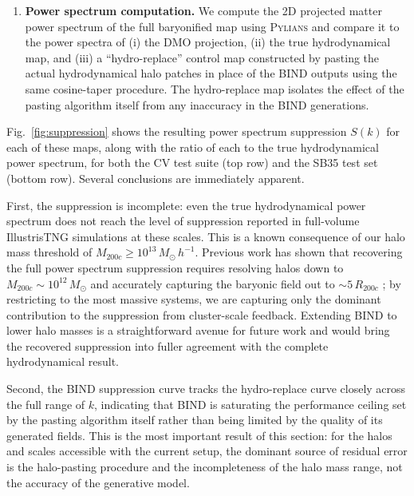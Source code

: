 \documentclass[linenumbers,trackchanges, twocolumn]{aastex701}
\begin{document}
\begin{enumerate}
    \item \textbf{Power spectrum computation.} We compute the 2D projected matter power spectrum of the full baryonified map using \textsc{Pylians} \citep{Pylians} and compare it to the power spectra of (i) the DMO projection, (ii) the true hydrodynamical map, and (iii) a ``hydro-replace'' control map constructed by pasting the actual hydrodynamical halo patches in place of the \textsc{BIND} outputs using the same cosine-taper procedure. The hydro-replace map isolates the effect of the pasting algorithm itself from any inaccuracy in the \textsc{BIND} generations.
\end{enumerate}

Fig.~\ref{fig:suppression} shows the resulting power spectrum suppression $S(k)$ for each of these maps, along with the ratio of each to the true hydrodynamical power spectrum, for both the CV test suite (top row) and the SB35 test set (bottom row). Several conclusions are immediately apparent.

First, the suppression is incomplete: even the true hydrodynamical power spectrum does not reach the level of suppression reported in full-volume IllustrisTNG simulations at these scales. This is a known consequence of our halo mass threshold of $M_{200c} \geq 10^{13}\,M_\odot\,h^{-1}$. Previous work has shown that recovering the full power spectrum suppression requires resolving halos down to $M_{200c} \sim 10^{12}\,M_\odot$ and accurately capturing the baryonic field out to $\sim 5\,R_{200c}$ \citep{vanDaalen-2020, Lee-2026a}; by restricting to the most massive systems, we are capturing only the dominant contribution to the suppression from cluster-scale feedback. Extending \textsc{BIND} to lower halo masses is a straightforward avenue for future work and would bring the recovered suppression into fuller agreement with the complete hydrodynamical result.

Second, the \textsc{BIND} suppression curve tracks the hydro-replace curve closely across the full range of $k$, indicating that \textsc{BIND} is saturating the performance ceiling set by the pasting algorithm itself rather than being limited by the quality of its generated fields. This is the most important result of this section: for the halos and scales accessible with the current setup, the dominant source of residual error is the halo-pasting procedure and the incompleteness of the halo mass range, not the accuracy of the generative model.
\end{document}
